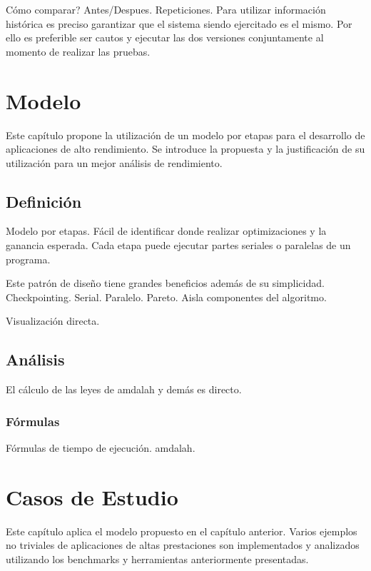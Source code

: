 \documentclass[a4paper]{report}
\begin{document}
C\'omo comparar? Antes/Despues. Repeticiones. Para utilizar informaci\'on
hist\'orica es preciso garantizar que el sistema siendo ejercitado es el mismo. Por ello es preferible ser cautos y ejecutar las dos versiones conjuntamente
al momento de realizar las pruebas. 

\chapter{Modelo}

Este cap\'itulo propone la utilizaci\'on de un modelo por etapas para el desarrollo de aplicaciones de alto rendimiento.
Se introduce la propuesta y la justificaci\'on de su utilizaci\'on para un mejor an\'alisis de rendimiento.

\section{Definici\'on}

Modelo por etapas. F\'acil de identificar donde realizar optimizaciones y la ganancia esperada.
Cada etapa puede ejecutar partes seriales o paralelas de un programa.


Este patr\'on de dise\~no tiene grandes beneficios adem\'as de su simplicidad. Checkpointing. Serial. Paralelo. Pareto.
Aisla componentes del algoritmo.

Visualizaci\'on directa.

\section{An\'alisis}

 El c\'alculo de las leyes de amdalah y dem\'as es directo.

\subsection{F\'ormulas}


\bigskip

F\'ormulas de tiempo de ejecuci\'on. amdalah.

\chapter{Casos de Estudio}

Este cap\'itulo aplica el modelo propuesto en el cap\'itulo anterior. Varios ejemplos no triviales de aplicaciones de altas prestaciones son implementados
y analizados utilizando los benchmarks y herramientas anteriormente presentadas.
\end{document}
